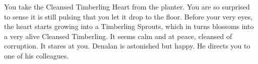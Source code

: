 
You take the Cleansed Timberling Heart from the planter. You are so surprised to sense it is still pulsing that you let it drop to the floor. Before your very eyes, the heart starts growing into a Timberling Sprouts, which in turns blossoms into a very alive Cleansed Timberling. It seems calm and at peace, cleansed of corruption. It stares at you. Denalan is astonished but happy. He directs you to one of his colleagues.

